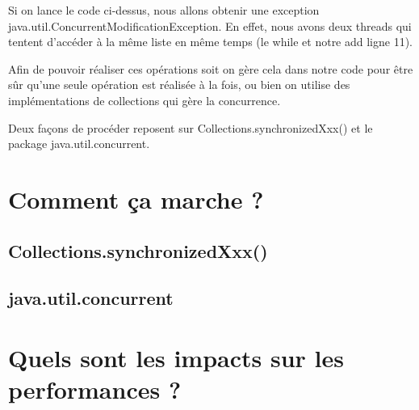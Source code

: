 \documentclass{report}
\begin{document}
			Si on lance le code ci-dessus, nous allons obtenir une exception java.util.ConcurrentModificationException.
			En effet, nous avons deux threads qui tentent d'accéder à la même liste en même temps (le while et notre add ligne 11).
			
			Afin de pouvoir réaliser ces opérations soit on gère cela dans notre code pour être sûr qu'une seule opération est réalisée à la fois, ou bien on utilise des implémentations de collections qui gère la concurrence.
			
			Deux façons de procéder reposent sur Collections.synchronizedXxx() et le package java.util.concurrent.
			
	\chapter{Comment ça marche ?}
		\section{Collections.synchronizedXxx()}
		\section{java.util.concurrent}
	\chapter{Quels sont les impacts sur les performances ?}
\end{document}
